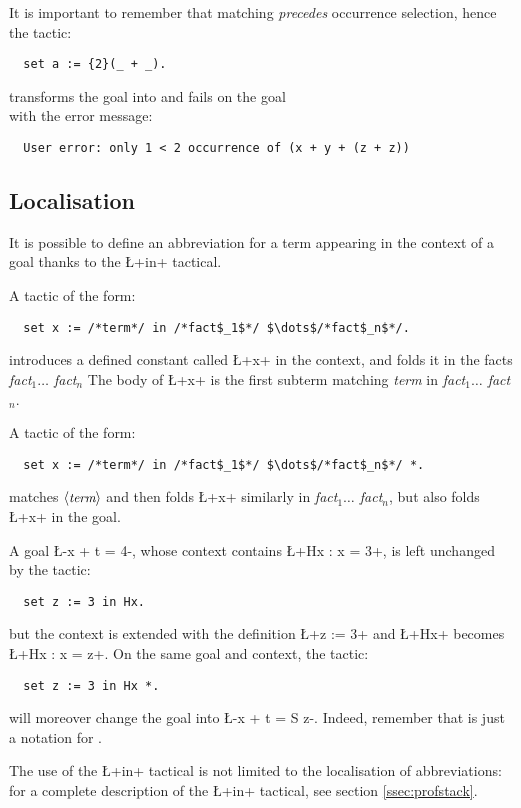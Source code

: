 It is important to remember that matching \emph{precedes} occurrence
selection, hence the tactic:
\begin{lstlisting}
  set a := {2}(_ + _).
\end{lstlisting}
transforms the goal  into 
and fails on the goal \\
 with the error message:
\begin{lstlisting}
  User error: only 1 < 2 occurrence of (x + y + (z + z))
\end{lstlisting}


\subsection{Localisation}\label{ssec:loc}


It is possible to define an abbreviation for a term appearing in the
context of a goal thanks to the \L+in+ tactical.

A tactic of the form:
\begin{lstlisting}
  set x := /*term*/ in /*fact$_1$*/ $\dots$/*fact$_n$*/.
\end{lstlisting}
introduces a defined constant called \L+x+ in the context, and folds
it in the facts \textit{fact$_1 \dots$ fact$_n$}
The body of \L+x+ is the first subterm matching \textit{term} in 
\textit{fact$_1 \dots$ fact$_n$}.

A tactic of the form:
\begin{lstlisting}
  set x := /*term*/ in /*fact$_1$*/ $\dots$/*fact$_n$*/ *.
\end{lstlisting}
matches $\langle\mbox{\itshape\rmfamily\small term}\rangle$ and then folds \L+x+ similarly in
\textit{fact$_1 \dots$ fact$_n$}, but also folds \L+x+ in the goal.

A goal \L-x + t = 4-, whose context contains \L+Hx : x = 3+, is left
unchanged by the tactic:
\begin{lstlisting}
  set z := 3 in Hx.
\end{lstlisting}
but the context is extended with the definition \L+z := 3+ and \L+Hx+ becomes
\L+Hx : x = z+.
On the same goal and context, the tactic:
\begin{lstlisting}
  set z := 3 in Hx *.
\end{lstlisting}
will moreover change the goal into \L-x + t = S z-. Indeed, remember
that  is just a notation for .

The use of the \L+in+ tactical is not limited to the localisation of
abbreviations: for a complete description of the \L+in+ tactical, see
section \ref{ssec:profstack}.



